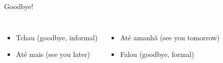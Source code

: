 \begin{frame}{Goodbye!}
  \begin{columns}
    \begin{itemize}
    \item<1-> Tchau (goodbye, informal)
    \item<2-> At\'e mais (see you later)
    \end{itemize}
    \begin{itemize}
    \item<3-> At\'e amanh\~a (see you tomorrow)
    \item<4-> Falou (goodbye, formal)
    \end{itemize}
  \end{columns}
\end{frame}